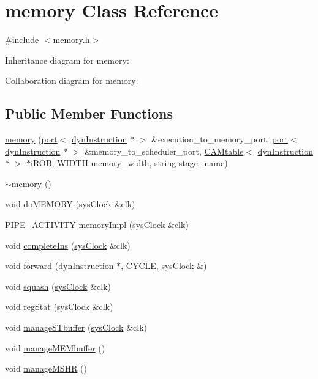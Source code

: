 \hypertarget{classmemory}{
\section{memory Class Reference}
\label{classmemory}
}


{\ttfamily \#include $<$memory.h$>$}



Inheritance diagram for memory:


Collaboration diagram for memory:
\subsection*{Public Member Functions}
\begin{DoxyCompactItemize}
\item 
\hyperlink{classmemory_a7fbe6b698c210120727c89f9b76ac24f}{memory} (\hyperlink{classport}{port}$<$ \hyperlink{classdynInstruction}{dynInstruction} $\ast$ $>$ \&execution\_\-to\_\-memory\_\-port, \hyperlink{classport}{port}$<$ \hyperlink{classdynInstruction}{dynInstruction} $\ast$ $>$ \&memory\_\-to\_\-scheduler\_\-port, \hyperlink{classCAMtable}{CAMtable}$<$ \hyperlink{classdynInstruction}{dynInstruction} $\ast$ $>$ $\ast$\hyperlink{backend_2parser_8cpp_ad73ae25f81e6e99482f3fbd5ba9664ce}{iROB}, \hyperlink{global_2global_8h_a6fa2e24b8a418fa215e183264cbea3aa}{WIDTH} memory\_\-width, string stage\_\-name)
\item 
\hyperlink{classmemory_ae5893b724ce22f38b776558384f21680}{$\sim$memory} ()
\item 
void \hyperlink{classmemory_ae667b5ac087faff10a52913146d6b627}{doMEMORY} (\hyperlink{classsysClock}{sysClock} \&clk)
\item 
\hyperlink{unit_2stage_8h_ab00e4188e8b8974fecb1dfd12764cbb1}{PIPE\_\-ACTIVITY} \hyperlink{classmemory_a3c2b4025c057acb762cc6630f324d3dc}{memoryImpl} (\hyperlink{classsysClock}{sysClock} \&clk)
\item 
void \hyperlink{classmemory_a684c9f7770f14ce500c0bb3b2d34cfa5}{completeIns} (\hyperlink{classsysClock}{sysClock} \&clk)
\item 
void \hyperlink{classmemory_a7b6cc36f06ee64246e6dfbda76a3cf34}{forward} (\hyperlink{classdynInstruction}{dynInstruction} $\ast$, \hyperlink{global_2global_8h_a7e19a550ec11d1ed921deb20c22efb5b}{CYCLE}, \hyperlink{classsysClock}{sysClock} \&)
\item 
void \hyperlink{classmemory_a88818ea5e9263294dc5e1fef01fb068f}{squash} (\hyperlink{classsysClock}{sysClock} \&clk)
\item 
void \hyperlink{classmemory_a2f2be279e08cd2180fb070a954fbc674}{regStat} (\hyperlink{classsysClock}{sysClock} \&clk)
\item 
void \hyperlink{classmemory_a43b452151bf034cd654a711b21078097}{manageSTbuffer} (\hyperlink{classsysClock}{sysClock} \&clk)
\item 
void \hyperlink{classmemory_a12d98865ad7d63dd9010ff931a5806b2}{manageMEMbuffer} ()
\item 
void \hyperlink{classmemory_a8206d3f11dccb62eb978540807c30ae7}{manageMSHR} ()
\end{DoxyCompactItemize}



